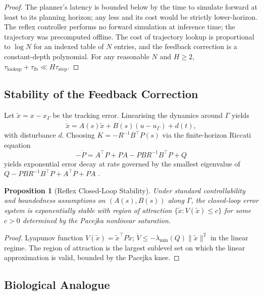 \documentclass[11pt,twocolumn]{article}
\newtheorem{proposition}[theorem]{Proposition}
\theoremstyle{definition}
\theoremstyle{remark}
\begin{document}
\begin{proof}
The planner's latency is bounded below by the time to simulate forward at least to its planning horizon; any less and its cost would be strictly lower-horizon. The reflex controller performs no forward simulation at inference time; the trajectory was precomputed offline. The cost of trajectory lookup is proportional to $\log N$ for an indexed table of $N$ entries, and the feedback correction is a constant-depth polynomial. For any reasonable $N$ and $H \ge 2$, $\tau_{\mathrm{lookup}} + \tau_{\mathrm{fb}} \ll H \tau_{\mathrm{step}}$.
\end{proof}

\subsection{Stability of the Feedback Correction}

Let $\tilde x = x - x_{\Gamma}$ be the tracking error. Linearising the dynamics around $\Gamma$ yields
\begin{equation}
\dot{\tilde x} = A(s) \tilde x + B(s)(u - u_{\Gamma}) + d(t),
\end{equation}
with disturbance $d$. Choosing $K = -R^{-1} B^{\top} P(s)$ via the finite-horizon Riccati equation
\begin{equation}
-\dot P = A^{\top} P + P A - P B R^{-1} B^{\top} P + Q
\end{equation}
yields exponential error decay at rate governed by the smallest eigenvalue of $Q - P B R^{-1} B^{\top} P + A^{\top}P + PA$ \cite{bryson1975applied,kirk2012optimal,bertsekas2012dynamic}.

\begin{proposition}[Reflex Closed-Loop Stability]\label{prop:reflex-stab}
Under standard controllability and boundedness assumptions on $(A(s), B(s))$ along $\Gamma$, the closed-loop error system is exponentially stable with region of attraction $\{\tilde x : V(\tilde x) \le c\}$ for some $c > 0$ determined by the Pacejka nonlinear saturation.
\end{proposition}

\begin{proof}
Lyapunov function $V(\tilde x) = \tilde x^{\top} P \tilde x$; $\dot V \le -\lambda_{\min}(Q) \|\tilde x\|^2$ in the linear regime. The region of attraction is the largest sublevel set on which the linear approximation is valid, bounded by the Pacejka knee.
\end{proof}

\subsection{Biological Analogue}
\end{document}
